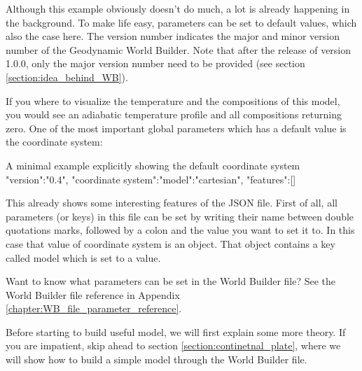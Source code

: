 \documentclass{book}
\newcommand{\GWB}{{Geodynamic World Builder}}
\newcommand{\WB}{{World Builder}}
\begin{document}
Although this example obviously doesn't do much, a lot is already happening in the background. To make life easy, parameters can be set to default values, which also the case here. The version number indicates the major and minor version number of the \GWB{}. Note that after the release of version 1.0.0, only the major version number need to be provided (see section \ref{section:idea_behind_WB}).

If you where to visualize the temperature and the compositions of this model, you would see an adiabatic temperature profile and all compositions returning zero. One of the most important global parameters which has a default value is the coordinate system:

\begin{javascriptcode}[label={lst:code_minimal_example_default_coordinate_system}]{A minimal example explicitly showing the default coordinate system}{}
{
  "version":"0.4",
  "coordinate system":{"model":"cartesian"},
  "features":[]
}
\end{javascriptcode}

This already shows some interesting features of the JSON file. First of all, all parameters (or keys) in this file can be set by writing their name between double quotations marks, followed by a colon and the value you want to set it to. In this case that value of coordinate system is an object. That object contains a key called model which is set to a value.
\begin{remark}
Want to know what parameters can be set in the \WB{} file? See the \WB{} file reference in Appendix \ref{chapter:WB_file_parameter_reference}.
\end{remark}
\begin{remark}
Before starting to build useful model, we will first explain some more theory. If you are impatient, skip ahead to section \ref{section:continetnal_plate}, where we will show how to build a simple model through the \WB{} file. 
\end{remark}
\end{document}
